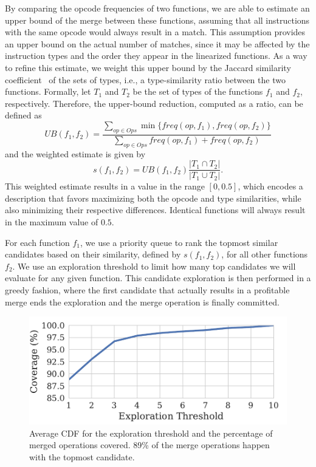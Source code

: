 By comparing the opcode frequencies of two functions, we are able to estimate
an upper bound of the merge between these functions, assuming that all
instructions with the same opcode would always result in a match.
This assumption provides an upper bound on the actual number of matches, since
it may be affected by the instruction types and the order they appear in the
linearized functions.
As a way to refine this estimate, we weight this upper bound by the Jaccard
similarity coefficient~\cite{jaccard} of the sets of types, i.e., a
type-similarity ratio between the two functions.
Formally, let $T_1$ and $T_2$ be the set of types of the functions $f_1$ and
$f_2$, respectively.
Therefore, the upper-bound reduction, computed as a ratio, can be defined as
\[
   U\!B(f_1,f_2) = \frac{\sum\limits_{op \in Ops} \min\{freq(op,f_1),freq(op,f_2)\}}{\sum\limits_{op \in Ops} freq(op,f_1)+freq(op,f_2)}
\]
and the weighted estimate is given by
\[
     s(f_1,f_2) = U\!B(f_1,f_2) \frac{|T_1 \cap T_2|}{|T_1 \cup T_2|}.
\]
This weighted estimate results in a value in the range $[0,0.5]$,
which encodes a description that favors maximizing both the opcode and type
similarities, while also minimizing their respective differences.
Identical functions will always result in the maximum value of $0.5$.

For each function $f_1$, we use a priority queue to rank the topmost
similar candidates based on their similarity, defined by $s(f_1,f_2)$, for all
other functions $f_2$.
We use an exploration threshold to limit how many top candidates we will
evaluate for any given function.
This candidate exploration is then performed in a greedy fashion, where the first
candidate that actually results in a profitable merge ends the exploration and
the merge operation is finally committed.

\begin{figure}[t!]
  \centering
  \includegraphics[width=0.8\linewidth]{figs/average-cdf-exploration-threshold.pdf}
  \caption{Average CDF for the exploration threshold and the percentage of merged operations covered.
           89\% of the merge operations happen with the topmost candidate.}
  \label{fig:average-cdf-exploration-threshold}
\end{figure}

